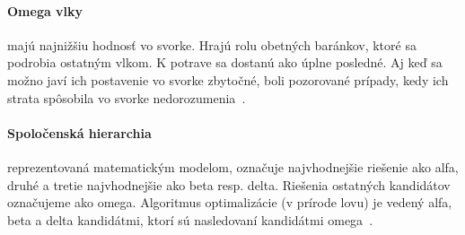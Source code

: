 \documentclass[a4paper,slovak,12pt,appendix]{article}
\begin{document}
\paragraph{Omega vlky} majú najnižšiu hodnosť vo svorke. Hrajú rolu obetných
baránkov, ktoré sa podrobia ostatným vlkom. K potrave sa dostanú ako úplne
posledné. Aj keď sa možno javí ich postavenie vo svorke zbytočné, boli
pozorované prípady, kedy ich strata spôsobila vo svorke
nedorozumenia~\cite{Seeley1991}.

\paragraph{Spoločenská hierarchia} reprezentovaná matematickým modelom,
označuje najvhodnejšie riešenie ako alfa, druhé a tretie najvhodnejšie ako beta
resp. delta. Riešenia ostatných kandidátov označujeme ako omega. Algoritmus
optimalizácie (v prírode lovu) je vedený alfa, beta a delta kandidátmi, ktorí
sú nasledovaní kandidátmi omega~\cite{Seeley1991}.
\end{document}
